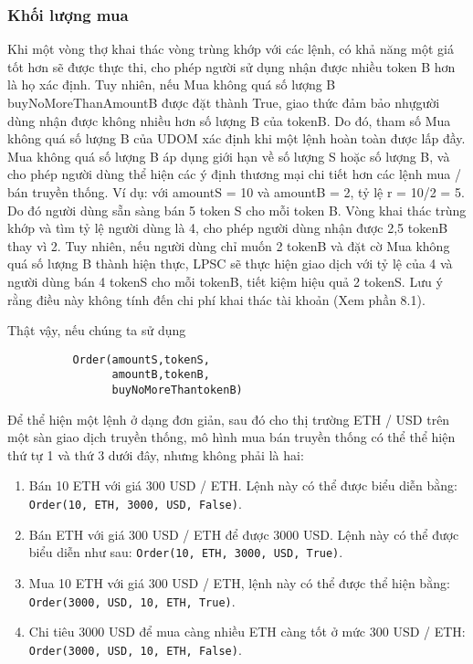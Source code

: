 \documentclass[12pt,a4paper]{article}
\begin{document}
\begin{multicols}{2}
\subsubsection{Khối lượng mua}
Khi một vòng thợ khai thác vòng trùng khớp với các lệnh, có khả năng một giá tốt hơn sẽ được thực thi, cho phép người sử dụng nhận được nhiều token B hơn là họ xác định. Tuy nhiên, nếu Mua không quá số lượng B buyNoMoreThanAmountB được đặt thành True, giao thức đảm bảo nhựgười dùng nhận được không nhiều hơn số lượng B của tokenB. Do đó, tham số Mua không quá số lượng B của UDOM xác định khi một lệnh hoàn toàn được lấp đầy. Mua không quá số lượng B áp dụng giới hạn về số lượng S hoặc số lượng B, và cho phép người dùng thể hiện các ý định thương mại chi tiết hơn các lệnh mua / bán truyền thống.
Ví dụ: với amountS = 10 và amountB = 2, tỷ lệ r = 10/2 = 5. Do đó người dùng sẵn sàng bán 5 token S cho mỗi token B. Vòng khai thác trùng khớp và tìm tỷ lệ người dùng là 4, cho phép người dùng nhận được 2,5 tokenB thay vì 2. Tuy nhiên, nếu người dùng chỉ muốn 2 tokenB và đặt cờ Mua không quá số lượng B  thành hiện thực, LPSC sẽ thực hiện giao dịch với tỷ lệ của 4 và người dùng bán 4 tokenS cho mỗi tokenB, tiết kiệm hiệu quả 2 tokenS. Lưu ý rằng điều này không tính đến chi phí khai thác tài khoản (Xem phần 8.1).

Thật vậy, nếu chúng ta sử dụng

\begin{verbatim}
	      Order(amountS,tokenS,
	            amountB,tokenB,
	            buyNoMoreThantokenB)
\end{verbatim}
Để thể hiện một lệnh ở dạng đơn giản, sau đó cho thị trường ETH / USD trên một sàn giao dịch truyền thống, mô hình mua bán truyền thống có thể thể hiện thứ tự 1 và thứ 3 dưới đây, nhưng không phải là hai:

\begin{enumerate}
	\item Bán 10 ETH với giá 300 USD / ETH. Lệnh này có thể được biểu diễn bằng:  \verb|Order(10, ETH, 3000, USD, False)|.
	\item Bán ETH với giá 300 USD / ETH để được 3000 USD. Lệnh này có thể được biểu diễn như sau:  \verb|Order(10, ETH, 3000, USD, True)|.
	\item Mua 10 ETH với giá 300 USD / ETH, lệnh này có thể được thể hiện bằng:   \verb|Order(3000, USD, 10, ETH, True)|.
	\item Chi tiêu 3000 USD để mua càng nhiều ETH càng tốt ở mức 300 USD / ETH: \verb|Order(3000, USD, 10, ETH, False)|.
\end{enumerate}


\end{multicols}
\end{document}
